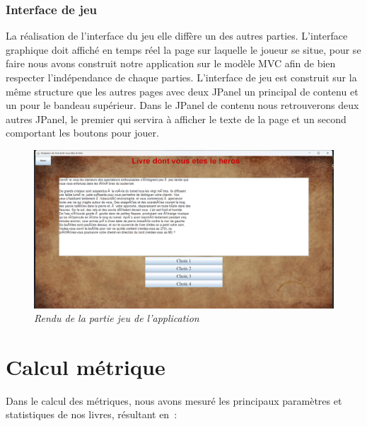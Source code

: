 \documentclass[a4paper,12pt]{article}
\begin{document}
\subsubsection{Interface de jeu}
La réalisation de l'interface du jeu elle diffère un des autres parties. L'interface graphique doit affiché en temps réel la page sur laquelle le joueur se situe, pour se faire nous avons construit notre application sur le modèle MVC afin de bien respecter l'indépendance de chaque parties. L'interface de jeu est construit sur la même structure que les autres pages avec deux JPanel un principal de contenu et un pour le bandeau supérieur. Dans le JPanel de contenu nous retrouverons deux autres JPanel, le premier qui servira à afficher le texte de la page et un second comportant les boutons pour jouer. 
\begin {figure}[h]
    \centering
    \includegraphics[width=\textwidth]{imgJeu.png}
{\small\textsl{Rendu de la partie jeu de l'application}}
\end {figure}
\newpage
\section{Calcul métrique}
Dans le calcul des métriques, nous avons mesuré les principaux paramètres et statistiques de nos livres, résultant en :\\


\end{document}
